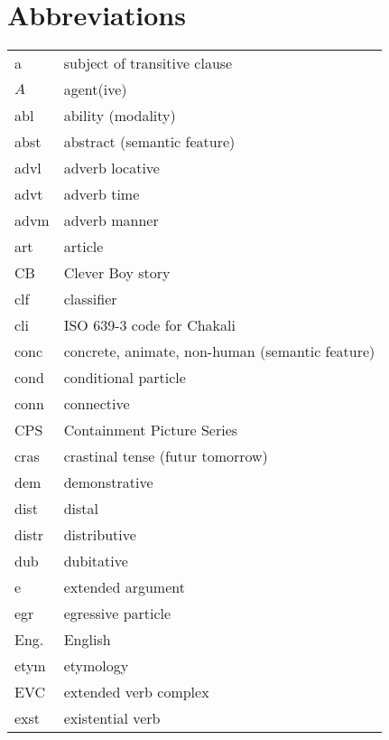 
\chapter*{Abbreviations}
\label{sec-ABB}


\thispagestyle{plain}

 \begin{xtabular}{ll}


{\sc a} & subject of transitive clause\\
$A$ & agent(ive) \\ 
{\sc abl} & ability (modality)\\
 {\sc abst} & abstract (semantic feature)\\
 {\sc advl} & adverb locative \\
 {\sc advt} & adverb time \\
{\sc advm} &  adverb manner\\
{\sc art} &  article\\


CB  & Clever Boy story\\
{\sc clf} & classifier\\
cli & ISO 639-3 code for Chakali\\
 {\sc conc} & concrete, animate, non-human (semantic feature)\\
 {\sc cond} & conditional particle\\
 {\sc conn} &  connective\\
CPS & Containment Picture Series\\
 {\sc cras} & crastinal tense (futur tomorrow) \\

 {\sc dem} & demonstrative \\
 {\sc dist} & distal \\%
 {\sc distr} & distributive \\
 {\sc dub} & dubitative \\%

{\sc e} & extended argument\\
{\sc egr} & egressive particle\\
Eng. & English\\
{\sc etym} & etymology\\
EVC & extended verb complex\\
{\sc exst} & existential verb\\



\end{xtabular}
